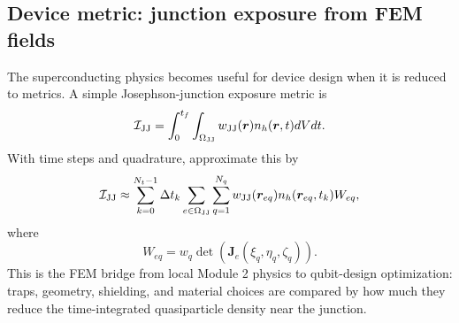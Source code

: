 \documentclass[11pt]{article}
\newcommand{\br}{{\bm{r}}}
\begin{document}
\subsection{Device metric: junction exposure from FEM fields}
The superconducting physics becomes useful for device design when it is reduced to metrics. A simple Josephson-junction exposure metric is
\begin{equation}
\mathcal{I}_{\JJ}
=\int_0^{t_f}\int_{\Omega_{\JJ}}w_{\JJ}(\br)n_h(\br,t)dVdt.
\end{equation}
With time steps and quadrature, approximate this by
\begin{equation}
\mathcal{I}_{\JJ}
\approx\sum_{k=0}^{N_t-1}\Delta t_k
\sum_{e\in\Omega_{\JJ}}\sum_{q=1}^{N_q}
 w_{\JJ}(\br_{eq}) n_h(\br_{eq},t_k) W_{eq},
\end{equation}
where
\begin{equation}
W_{eq}=w_q\det(\bm{J}_e(\xi_q,\eta_q,\zeta_q)).
\end{equation}
This is the FEM bridge from local Module 2 physics to qubit-design optimization: traps, geometry, shielding, and material choices are compared by how much they reduce the time-integrated quasiparticle density near the junction.
\end{document}
